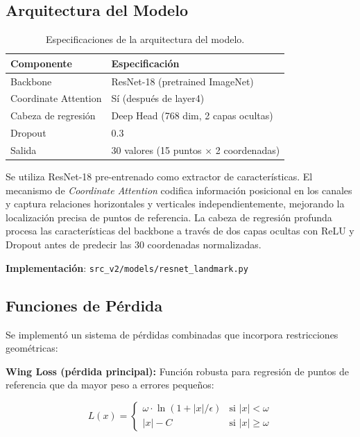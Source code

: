 \documentclass[12pt,a4paper]{article}
\newcommand{\code}[1]{\texttt{#1}}
\begin{document}
\subsection{Arquitectura del Modelo}

\begin{table}[H]
\centering
\begin{tabular}{ll}
\toprule
\textbf{Componente} & \textbf{Especificación} \\
\midrule
Backbone & ResNet-18 (pretrained ImageNet) \\
Coordinate Attention & Sí (después de layer4) \\
Cabeza de regresión & Deep Head (768 dim, 2 capas ocultas) \\
Dropout & 0.3 \\
Salida & 30 valores (15 puntos $\times$ 2 coordenadas) \\
\bottomrule
\end{tabular}
\caption{Especificaciones de la arquitectura del modelo.}
\end{table}

Se utiliza ResNet-18 pre-entrenado como extractor de características. El mecanismo de \textit{Coordinate Attention} codifica información posicional en los canales y captura relaciones horizontales y verticales independientemente, mejorando la localización precisa de puntos de referencia. La cabeza de regresión profunda procesa las características del backbone a través de dos capas ocultas con ReLU y Dropout antes de predecir las 30 coordenadas normalizadas.

\textbf{Implementación}: \code{src\_v2/models/resnet\_landmark.py}

\subsection{Funciones de Pérdida}

Se implementó un sistema de pérdidas combinadas que incorpora restricciones geométricas:

\textbf{Wing Loss (pérdida principal):} Función robusta para regresión de puntos de referencia que da mayor peso a errores pequeños:

\begin{equation}
L(x) = \begin{cases}
\omega \cdot \ln(1 + |x|/\epsilon) & \text{si } |x| < \omega \\
|x| - C & \text{si } |x| \geq \omega
\end{cases}
\end{equation}
\end{document}
